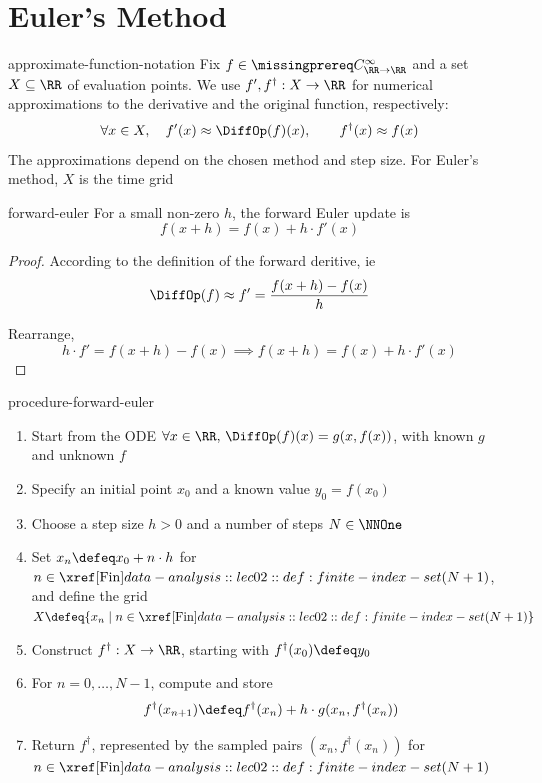 \documentclass[12pt]{article}
\numberwithin{figure}{section}
\begin{document}
\section{Euler's Method}

\begin{conv}{approximate-function-notation}
  Fix $f\in\SmoothRealFunctions$ and a set $X\subseteq\RR$ of evaluation
  points. We use $f',f^\dagger:X\to\RR$ for numerical approximations
  to the derivative and the original function, respectively:
  \[
    \forall x\in X,\quad
    f'(x)\approx\DiffOp(f)(x),\qquad f^\dagger(x)\approx f(x)
  \]
  The approximations depend on the chosen method and step size.
  For Euler's method, $X$ is the time grid
\end{conv}

\begin{conv}{forward-euler}
For a small non-zero $h$, the forward Euler update is
\[f(x+h) = f(x) + h \cdot f'(x)\]
\end{conv}

\begin{proof}
According to the definition of the forward deritive, ie 
\[\DiffOp(f) \approx f' = \frac{f(x+h)-f(x)}{h}\] 

Rearrange, 
\[h \cdot f' = f(x+h)-f(x) \implies f(x+h) = f(x) + h \cdot f'(x)\] 
\end{proof}

\begin{conv}{procedure-forward-euler}
\begin{enumerate}[nosep]
\item Start from the ODE
  $\forall x\in\RR,\,\DiffOp(f)(x)=g(x,f(x))$,
  with known $g$ and unknown $f$
\item Specify an initial point $x_0$ and a known value $y_0=f(x_0)$
\item Choose a step size $h>0$ and a number of steps $N\in\NNOne$
\item Set $x_n\defeq x_0+n\cdot h$ for $n\in\Fin(N+1)$, and define
  the grid $X\defeq\{x_n\mid n\in\Fin(N+1)\}$
\item Construct $f^\dagger:X\to\RR$, starting with
  $f^\dagger(x_0)\defeq y_0$
\item For $n=0,\ldots,N-1$, compute and store
  \[
    f^\dagger(x_{n+1})\defeq f^\dagger(x_n)
      +h\cdot g(x_n,f^\dagger(x_n))
  \]
\item Return $f^\dagger$, represented by the sampled pairs
  $(x_n,f^\dagger(x_n))$ for $n\in\Fin(N+1)$
\end{enumerate}
\end{conv}
\end{document}
